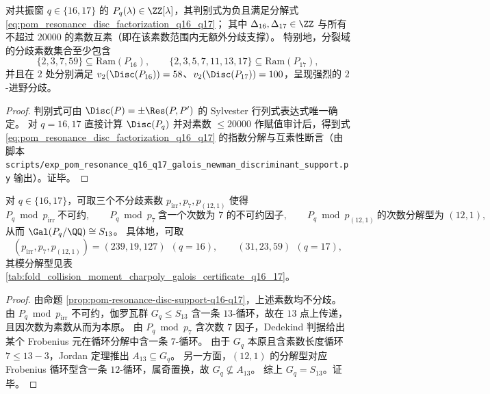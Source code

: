 \begin{proposition}[判别式的分歧支撑与 \texorpdfstring{$2$}{2}-进分歧强度（\texorpdfstring{$q=16,17$}{q=16,17}）]\label{prop:pom-resonance-disc-support-q16-q17}
对共振窗 \(q\in\{16,17\}\) 的 \(P_q(\lambda)\in\ZZ[\lambda]\)，其判别式为负且满足分解式 \eqref{eq:pom_resonance_disc_factorization_q16_q17}；
其中 \(\Delta_{16},\Delta_{17}\in\ZZ\) 与所有不超过 \(20000\) 的素数互素（即在该素数范围内无额外分歧支撑）。
特别地，分裂域的分歧素数集合至少包含
\[
\{2,3,7,59\}\subseteq \mathrm{Ram}(P_{16}),
\qquad
\{2,3,5,7,11,13,17\}\subseteq \mathrm{Ram}(P_{17}),
\]
并且在 \(2\) 处分别满足 \(v_2(\Disc(P_{16}))=58\)、\(v_2(\Disc(P_{17}))=100\)，呈现强烈的 \(2\)-进野分歧。
\end{proposition}
\begin{proof}
判别式可由 \(\Disc(P)=\pm\Res(P,P')\) 的 Sylvester 行列式表达式唯一确定。
对 \(q=16,17\) 直接计算 \(\Disc(P_q)\) 并对素数 \(\le 20000\) 作赋值审计后，得到式 \eqref{eq:pom_resonance_disc_factorization_q16_q17} 的指数分解与互素性断言（由脚本 \texttt{scripts/exp\_pom\_resonance\_q16\_q17\_galois\_newman\_discriminant\_support.py} 输出）。证毕。
\end{proof}

\begin{corollary}[Frobenius 循环型证书推出 \texorpdfstring{$S_{13}$}{S13}（\texorpdfstring{$q=16,17$}{q=16,17}）]\label{cor:pom-resonance-s13-frobenius-cycle-certificate-q16-q17}
对 \(q\in\{16,17\}\)，可取三个不分歧素数 \(p_{\mathrm{irr}},p_{7},p_{(12,1)}\) 使得
\[
P_q\bmod p_{\mathrm{irr}}\ \text{不可约},\qquad
P_q\bmod p_{7}\ \text{含一个次数为 \(7\) 的不可约因子},\qquad
P_q\bmod p_{(12,1)}\ \text{的次数分解型为 }(12,1),
\]
从而 \(\Gal(P_q/\QQ)\cong S_{13}\)。
具体地，可取
\[
(p_{\mathrm{irr}},p_{7},p_{(12,1)})=(239,19,127)\ \ (q=16),
\qquad
(31,23,59)\ \ (q=17),
\]
其模分解型见表 \ref{tab:fold_collision_moment_charpoly_galois_certificate_q16_17}。
\end{corollary}
\begin{proof}
由命题 \ref{prop:pom-resonance-disc-support-q16-q17}，上述素数均不分歧。
由 \(P_q\bmod p_{\mathrm{irr}}\) 不可约，伽罗瓦群 \(G_q\le S_{13}\) 含一条 \(13\)-循环，故在 \(13\) 点上传递，且因次数为素数从而为本原。
由 \(P_q\bmod p_7\) 含次数 \(7\) 因子，Dedekind 判据给出某个 Frobenius 元在循环分解中含一条 \(7\)-循环。
由于 \(G_q\) 本原且含素数长度循环 \(7\le 13-3\)，Jordan 定理推出 \(A_{13}\subseteq G_q\)。
另一方面，\((12,1)\) 的分解型对应 Frobenius 循环型含一条 \(12\)-循环，属奇置换，故 \(G_q\not\subseteq A_{13}\)。
综上 \(G_q=S_{13}\)。证毕。
\end{proof}

